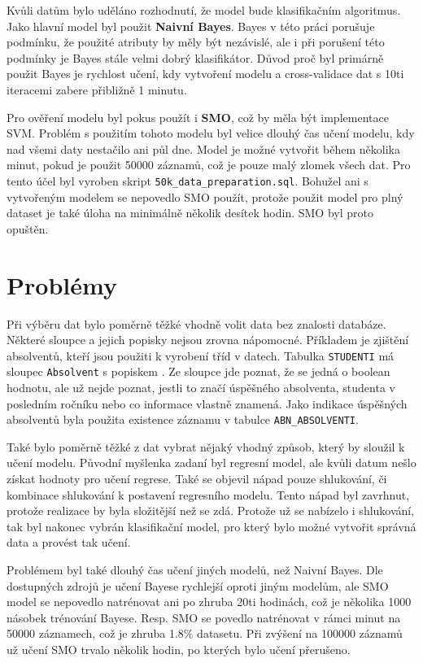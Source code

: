 \documentclass[12pt, letterpaper]{article}
\begin{document}
Kvůli datům bylo uděláno rozhodnutí, že model bude klasifikačním algoritmus. Jako hlavní model byl použit 
\textbf{Naivní Bayes}.
Bayes v této práci porušuje podmínku, že použité atributy by měly být nezávislé, ale i při porušení této podmínky je 
Bayes stále velmi dobrý klasifikátor. Důvod proč byl primárně použit Bayes je rychlost učení, kdy vytvoření modelu 
a cross-validace dat s 10ti iteracemi zabere přibližně 1 minutu.

Pro ověření modelu byl pokus použít i \textbf{SMO}, což by měla být implementace SVM. Problém s použitím tohoto modelu 
byl velice dlouhý čas učení modelu, kdy nad všemi daty nestačilo ani půl dne. Model je možné vytvořit během několika
minut, pokud je použit 50000 záznamů, což je pouze malý zlomek všech dat. Pro tento účel byl vyroben skript 
\texttt{50k\_data\_preparation.sql}. Bohužel ani s vytvořeným modelem se nepovedlo SMO použít, protože použit model
pro plný dataset je také úloha na minimálně několik desítek hodin. SMO byl proto opuštěn.
\section{Problémy}
Při výběru dat bylo poměrně těžké vhodně volit data bez znalosti databáze. Některé sloupce a jejich popisky nejsou 
zrovna nápomocné. Příkladem je zjištění absolventů, kteří jsou použiti k vyrobení tříd v datech. Tabulka 
\texttt{STUDENTI} má sloupec \texttt{Absolvent} s popiskem . Ze sloupce jde poznat, že se jedná o 
boolean hodnotu, ale už nejde poznat, jestli to značí úspěšného absolventa, studenta v posledním ročníku nebo co 
informace vlastně znamená. Jako indikace úspěšných absolventů byla použita existence záznamu v tabulce 
\texttt{ABN\_ABSOLVENTI}.

Také bylo poměrně těžké z dat vybrat nějaký vhodný způsob, který by sloužil k učení modelu. Původní myšlenka zadaní
byl regresní model, ale kvůli datum nešlo získat hodnoty pro učení regrese. Také se objevil nápad pouze shlukování,
či kombinace shlukování k postavení regresního modelu. Tento nápad byl zavrhnut, protože realizace by byla složitější
než se zdá. Protože už se nabízelo i shlukování, tak byl nakonec vybrán klasifikační model, pro který bylo možné 
vytvořit správná data a provést tak učení.

Problémem byl také dlouhý čas učení jiných modelů, než Naivní Bayes. Dle dostupných zdrojů je učení Bayese rychlejší
oproti jiným modelům, ale SMO model se nepovedlo natrénovat ani po zhruba 20ti hodinách, což je několika 1000 násobek
trénování Bayese. Resp. SMO se povedlo natrénovat v rámci minut na 50000 záznamech, což je zhruba 1.8\% datasetu.
Při zvýšení na 100000 záznamů už učení SMO trvalo několik hodin, po kterých bylo učení přerušeno.
\end{document}
